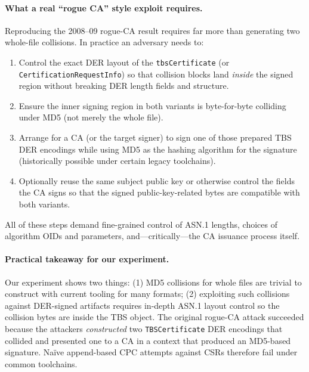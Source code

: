 \documentclass[runningheads]{llncs}
\begin{document}
    \paragraph{What a real ``rogue CA'' style exploit requires.}
    Reproducing the 2008–09 rogue-CA result requires far more than generating two whole-file collisions. In practice an adversary needs to:
    \begin{enumerate}
        \item Control the exact DER layout of the \texttt{tbsCertificate} (or \texttt{CertificationRequestInfo}) so that collision blocks land \emph{inside} the signed region without breaking DER length fields and structure.
        \item Ensure the inner signing region in both variants is byte-for-byte colliding under MD5 (not merely the whole file).
        \item Arrange for a CA (or the target signer) to sign one of those prepared TBS DER encodings while using MD5 as the hashing algorithm for the signature (historically possible under certain legacy toolchains).
        \item Optionally reuse the same subject public key or otherwise control the fields the CA signs so that the signed public-key-related bytes are compatible with both variants.
    \end{enumerate}
    All of these steps demand fine-grained control of ASN.1 lengths, choices of algorithm OIDs and parameters, and—critically—the CA issuance process itself.

    \paragraph{Practical takeaway for our experiment.}
    Our experiment shows two things: (1) MD5 collisions for whole files are trivial to construct with current tooling for many formats; (2) exploiting such collisions against DER-signed artifacts requires in-depth ASN.1 layout control so the collision bytes are inside the TBS object. The original rogue-CA attack succeeded because the attackers \emph{constructed} two \texttt{TBSCertificate} DER encodings that collided and presented one to a CA in a context that produced an MD5-based signature. Naïve append-based CPC attempts against CSRs therefore fail under common toolchains.
\end{document}
